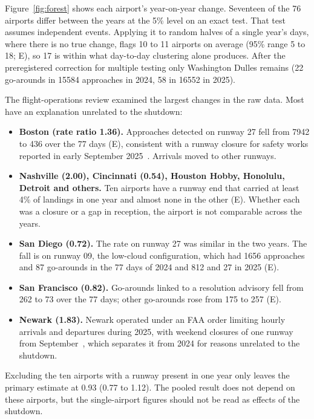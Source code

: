 \documentclass[11pt]{article}
\begin{document}
Figure~\ref{fig:forest} shows each airport's year-on-year change. Seventeen of the 76 airports differ between the years at the 5\% level on an exact test. That test assumes independent events. Applying it to random halves of a single year's days, where there is no true change, flags 10 to 11 airports on average (95\% range 5 to 18; E), so 17 is within what day-to-day clustering alone produces. After the preregistered correction for multiple testing only Washington Dulles remains (22 go-arounds in \num{15584} approaches in 2024, 58 in \num{16552} in 2025).

The flight-operations review examined the largest changes in the raw data. Most have an explanation unrelated to the shutdown:

\begin{itemize}
\item \textbf{Boston (rate ratio 1.36).} Approaches detected on runway 27 fell from \num{7942} to 436 over the 77 days (E), consistent with a runway closure for safety works reported in early September 2025~\cite{ain2025bos}. Arrivals moved to other runways.
\item \textbf{Nashville (2.00), Cincinnati (0.54), Houston Hobby, Honolulu, Detroit and others.} Ten airports have a runway end that carried at least 4\% of landings in one year and almost none in the other (E). Whether each was a closure or a gap in reception, the airport is not comparable across the years.
\item \textbf{San Diego (0.72).} The rate on runway 27 was similar in the two years. The fall is on runway 09, the low-cloud configuration, which had \num{1656} approaches and 87 go-arounds in the 77 days of 2024 and 812 and 27 in 2025 (E).
\item \textbf{San Francisco (0.82).} Go-arounds linked to a resolution advisory fell from 262 to 73 over the 77 days; other go-arounds rose from 175 to 257 (E).
\item \textbf{Newark (1.83).} Newark operated under an FAA order limiting hourly arrivals and departures during 2025, with weekend closures of one runway from September~\cite{faa2025ewr}, which separates it from 2024 for reasons unrelated to the shutdown.
\end{itemize}

Excluding the ten airports with a runway present in one year only leaves the primary estimate at 0.93 (0.77 to 1.12). The pooled result does not depend on these airports, but the single-airport figures should not be read as effects of the shutdown.
\end{document}

